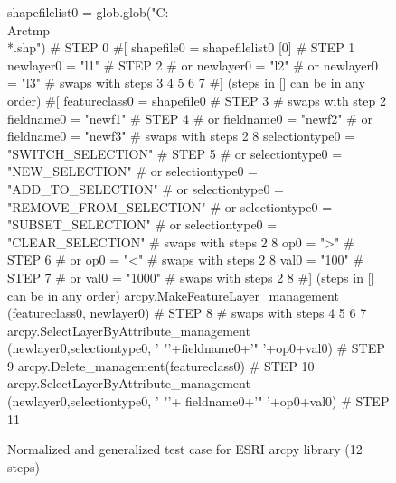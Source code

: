 \begin{figure}
{\scriptsize 
\begin{code}
shapefilelist0 = 
   glob.glob("C:\\Arctmp\\*.shp")        \# STEP 0
\#[
shapefile0 = shapefilelist0 [0]        \# STEP 1
newlayer0 = "l1"                       \# STEP 2
\#  or newlayer0 = "l2" 
\#  or newlayer0 = "l3" 
\#  swaps with steps 3 4 5 6 7
\#] (steps in [] can be in any order)
\#[
featureclass0 = shapefile0             \# STEP 3
\#  swaps with step 2
fieldname0 = "newf1"                   \# STEP 4
\#  or fieldname0 = "newf2" 
\#  or fieldname0 = "newf3" 
\#  swaps with steps 2 8
selectiontype0 = "SWITCH\_SELECTION"    \# STEP 5
\#  or selectiontype0 = "NEW\_SELECTION" 
\#  or selectiontype0 = "ADD\_TO\_SELECTION" 
\#  or selectiontype0 = "REMOVE\_FROM\_SELECTION"
\#  or selectiontype0 = "SUBSET\_SELECTION"
\#  or selectiontype0 = "CLEAR\_SELECTION"   
\#  swaps with steps 2 8
op0 = ">"                              \# STEP 6
\#  or op0 = "<" 
\#  swaps with steps 2 8
val0 = "100"                           \# STEP 7
\#  or val0 = "1000" 
\#  swaps with steps 2 8
\#] (steps in [] can be in any order)
arcpy.MakeFeatureLayer\_management
   (featureclass0, newlayer0)          \# STEP 8
\#  swaps with steps 4 5 6 7
arcpy.SelectLayerByAttribute\_management
   (newlayer0,selectiontype0,
   ' "'+fieldname0+'" '+op0+val0)      \# STEP 9
arcpy.Delete\_management(featureclass0) \# STEP 10
arcpy.SelectLayerByAttribute\_management
   (newlayer0,selectiontype0,
   ' "'+ fieldname0+'" '+op0+val0)     \# STEP 11
\end{code}
}
\caption{Normalized and generalized test case for ESRI arcpy library
  (12 steps)}
\end{figure}